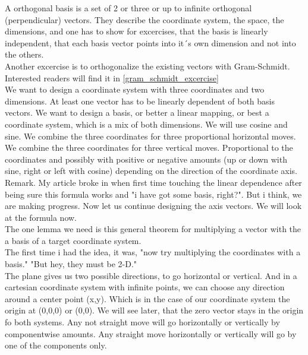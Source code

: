 \documentclass[a4paper]{article}
\begin{document}
\begin{Example}
A orthogonal basis is a set of 2 or three or up to infinite orthogonal (perpendicular) vectors. They describe the coordinate system, the space, the dimensions, and one has to show for excercises, that the basis is linearly independent, that each basis vector points into it´s own dimension and not into the others. \\

Another excercise is to orthogonalize the existing vectors with Gram-Schmidt. Interested readers will find it in \ref{gram_schmidt_excercise} \\

We want to design a coordinate system with three coordinates and two dimensions. At least one vector has to be linearly dependent of both basis vectors. We want to design a basis, or better a linear mapping, or best a coordinate system, which is a mix of both dimensions. We will use cosine and sine. We combine the three coordinates for three proportional horizontal moves. We combine the three coordinates for three vertical moves. Proportional to the coordinates and possibly with positive or negative amounts (up or down with sine, right or left with cosine) depending on the direction of the coordinate axis.\\

Remark. My article broke in when first time touching the linear dependence after being sure this formula works and "i have got some basis, right?". But i think, we are making progress. Now let us continue designing the axis vectors. We will look at the formula now.\\

The one lemma we need is this general theorem for multiplying a vector with the a basis of a target coordinate system.\\

The first time i had the idea, it was, "now try multiplying the coordinates with a basis." "But hey, they must be 2-D."\\

The plane gives us two possible directions, to go horizontal or vertical. And in a cartesian coordinate system with infinite points, we can choose any direction around a center point (x,y). Which is in the case of our coordinate system the origin at (0,0,0) or (0,0). We will see later, that the zero vector stays in the origin fo both systems.
Any not straight move will go horizontally or vertically by componentwise amounts. Any straight move horizontally or vertically will go by one of the components only.\\


\end{Example}
\end{document}
